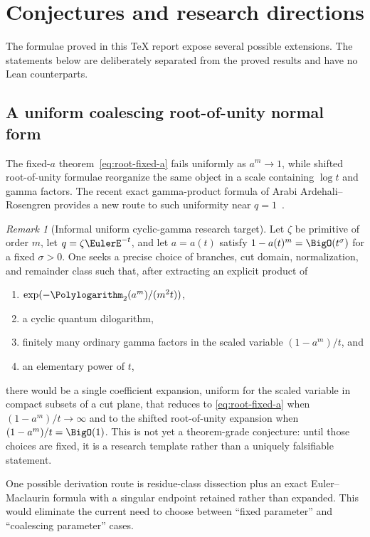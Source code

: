 \documentclass[11pt,oneside]{article}
\theoremstyle{definition}
\theoremstyle{remark}
\newtheorem{remark}[theorem]{Remark}
\let\reporttopsection\section
\let\reportsubsection\subsection
\let\chapter\reporttopsection
\let\section\reportsubsection
\begin{document}
\chapter{Conjectures and research directions}\label{chap:frontiers}

The formulae proved in this TeX report expose several possible extensions.
The statements below are deliberately separated from the proved results and
have no Lean counterparts.

\section{A uniform coalescing root-of-unity normal form}

The fixed-$a$ theorem~\eqref{eq:root-fixed-a} fails uniformly as $a^m\to1$,
while shifted root-of-unity formulae reorganize the same object in a scale
containing $\log t$ and gamma factors.  The recent exact gamma-product formula
of Arabi Ardehali--Rosengren provides a new route to such uniformity near
$q=1$~\cite{ArdehaliRosengren}.

\begin{remark}[Informal uniform cyclic-gamma research target]\label{conj:uniform-root}
Let $\zeta$ be primitive of order $m$, let
$q=\zeta\EulerE^{-t}$, and let
$a=a(t)$ satisfy
\(
1-a(t)^m=\BigO(t^\sigma)
\)
for a fixed $\sigma>0$.  One seeks a precise choice of branches, cut domain,
normalization, and remainder class such that, after extracting an explicit
product of
\begin{enumerate}[label=\textup{(\roman*)}]
\item $\exp(-\Polylogarithm_2(a^m)/(m^2t))$,
\item a cyclic quantum dilogarithm,
\item finitely many ordinary gamma factors in the scaled variable
      $(1-a^m)/t$, and
\item an elementary power of $t$,
\end{enumerate}
there would be a single coefficient expansion, uniform for the scaled variable in
compact subsets of a cut plane, that reduces to
\eqref{eq:root-fixed-a} when $(1-a^m)/t\to\infty$ and to the shifted
root-of-unity expansion when $(1-a^m)/t=\BigO(1)$.
This is not yet a theorem-grade conjecture: until those choices are fixed, it
is a research template rather than a uniquely falsifiable statement.
\end{remark}

One possible derivation route is residue-class dissection plus an exact
Euler--Maclaurin formula with a singular endpoint retained rather than
expanded.  This would eliminate the current need to choose between ``fixed
parameter'' and ``coalescing parameter'' cases.
\end{document}

